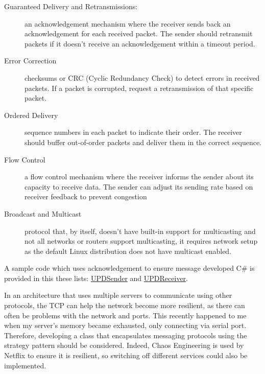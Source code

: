 \documentclass{article}
\begin{document}
\begin{description}
\item[Guaranteed Delivery and Retransmissions:] an acknowledgement mechanism where the receiver sends back an acknowledgement for each received packet. The sender should retransmit packets if it doesn't receive an acknowledgement within a timeout period.
\item[Error Correction] checksums or CRC (Cyclic Redundancy Check) to detect errors in received packets. If a packet is corrupted, request a retransmission of that specific packet.
\item[Ordered Delivery] sequence numbers in each packet to indicate their order. The receiver should buffer out-of-order packets and deliver them in the correct sequence.
\item[Flow Control]a flow control mechanism where the receiver informs the sender about its capacity to receive data. The sender can adjust its sending rate based on receiver feedback to prevent congestion 
\item[Broadcast and Multicast]  protocol that, by itself, doesn't have built-in support for multicasting and not all networks or routers support multicasting, it requires network setup as the default Linux distribution does not have multicast enabled.
\end{description}

 A sample code which uses acknowledgement to ensure message developed C\# is provided in this these lists: \href{https://gist.github.com/b1ngster/50f5814d010b6d2cd79eec733a0d2bf1}{UPDSender} and \href{https://gist.github.com/b1ngster/50f5814d010b6d2cd79eec733a0d2bf1}{UPDReceiver}. 











 

In an architecture that uses multiple servers to communicate using other protocols, the TCP can help the network become more resilient, as there can often be problems with the network and ports. This recently happened to me when my server's memory became exhausted, only connecting via serial port. Therefore, developing a class that encapsulates messaging protocols using the strategy pattern should be considered. Indeed, Chaos Engineering is used by Netflix to ensure it is resilient, so switching off different services could also be implemented. 
\end{document}
